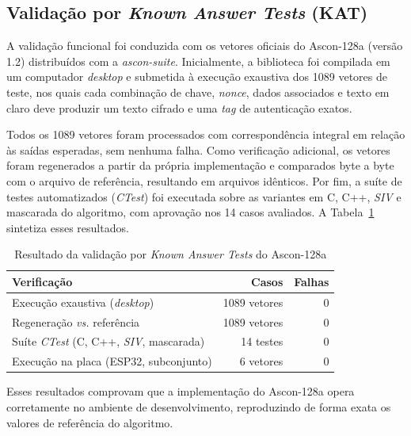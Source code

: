 
\subsection{Validação por \textit{Known Answer Tests} (KAT)}
\label{subsec:kat_resultados}

A validação funcional foi conduzida com os vetores oficiais do Ascon-128a (versão 1.2) distribuídos com a \textit{ascon-suite}. Inicialmente, a biblioteca foi compilada em um computador \textit{desktop} e submetida à execução exaustiva dos 1089 vetores de teste, nos quais cada combinação de chave, \textit{nonce}, dados associados e texto em claro deve produzir um texto cifrado e uma \textit{tag} de autenticação exatos.

Todos os 1089 vetores foram processados com correspondência integral em relação às saídas esperadas, sem nenhuma falha. Como verificação adicional, os vetores foram regenerados a partir da própria implementação e comparados byte a byte com o arquivo de referência, resultando em arquivos idênticos. Por fim, a suíte de testes automatizados (\textit{CTest}) foi executada sobre as variantes em C, C++, \textit{SIV} e mascarada do algoritmo, com aprovação nos 14 casos avaliados. A Tabela~\ref{tab:kat_ascon128a} sintetiza esses resultados.

\begin{table}[htb]
\centering
\caption{Resultado da validação por \textit{Known Answer Tests} do Ascon-128a}
\label{tab:kat_ascon128a}
\begin{tabular}{lrr}
\hline
\textbf{Verificação} & \textbf{Casos} & \textbf{Falhas} \\
\hline
Execução exaustiva (\textit{desktop})                  & 1089 vetores & 0 \\
Regeneração \textit{vs.} referência                    & 1089 vetores & 0 \\
Suíte \textit{CTest} (C, C++, \textit{SIV}, mascarada) & 14 testes    & 0 \\
Execução na placa (ESP32, subconjunto)                 & 6 vetores    & 0 \\
\hline
\end{tabular}
\end{table}

Esses resultados comprovam que a implementação do Ascon-128a opera corretamente no ambiente de desenvolvimento, reproduzindo de forma exata os valores de referência do algoritmo.

